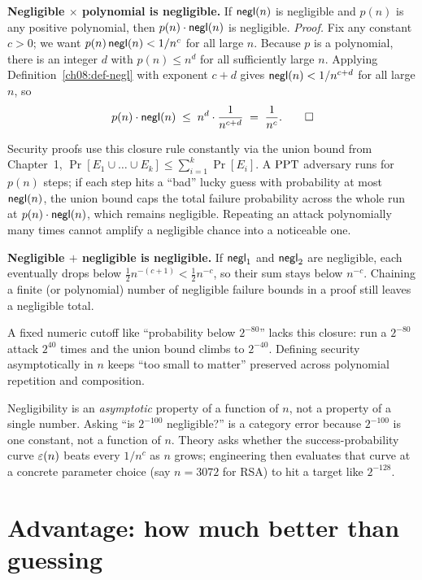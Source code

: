 \begin{whybox}
\textbf{Negligible $\times$ polynomial is negligible.} If $\mathsf{negl}(n)$ is negligible and $p(n)$ is any positive polynomial, then $p(n)\cdot\mathsf{negl}(n)$ is negligible. \emph{Proof.} Fix any constant $c > 0$; we want $p(n)\,\mathsf{negl}(n) < 1/n^{c}$ for all large $n$. Because $p$ is a polynomial, there is an integer $d$ with $p(n) \le n^{d}$ for all sufficiently large $n$. Applying Definition~\ref{ch08:def-negl} with exponent $c + d$ gives $\mathsf{negl}(n) < 1/n^{c+d}$ for all large $n$, so
\[
p(n)\cdot\mathsf{negl}(n) \;\le\; n^{d}\cdot \frac{1}{n^{c+d}} \;=\; \frac{1}{n^{c}}. \qquad \square
\]

Security proofs use this closure rule constantly via the union bound from Chapter~1, $\Pr[E_1 \cup \dots \cup E_k] \le \sum_{i=1}^{k}\Pr[E_i]$. A $\mathrm{PPT}$ adversary runs for $p(n)$ steps; if each step hits a ``bad'' lucky guess with probability at most $\mathsf{negl}(n)$, the union bound caps the total failure probability across the whole run at $p(n)\cdot\mathsf{negl}(n)$, which remains negligible. Repeating an attack polynomially many times cannot amplify a negligible chance into a noticeable one.

\medskip
\textbf{Negligible $+$ negligible is negligible.} If $\mathsf{negl}_1$ and $\mathsf{negl}_2$ are negligible, each eventually drops below $\tfrac{1}{2}n^{-(c+1)} < \tfrac{1}{2}n^{-c}$, so their sum stays below $n^{-c}$. Chaining a finite (or polynomial) number of negligible failure bounds in a proof still leaves a negligible total.
\end{whybox}

A fixed numeric cutoff like ``probability below $2^{-80}$'' lacks this closure: run a $2^{-80}$ attack $2^{40}$ times and the union bound climbs to $2^{-40}$. Defining security asymptotically in $n$ keeps ``too small to matter'' preserved across polynomial repetition and composition.

\begin{trapbox}
Negligibility is an \emph{asymptotic} property of a function of $n$, not a property of a single number. Asking ``is $2^{-100}$ negligible?'' is a category error because $2^{-100}$ is one constant, not a function of $n$. Theory asks whether the success-probability curve $\varepsilon(n)$ beats every $1/n^c$ as $n$ grows; engineering then evaluates that curve at a concrete parameter choice (say $n = 3072$ for RSA) to hit a target like $2^{-128}$.
\end{trapbox}
\section{Advantage: how much better than guessing}
\label{ch08:advantage}

